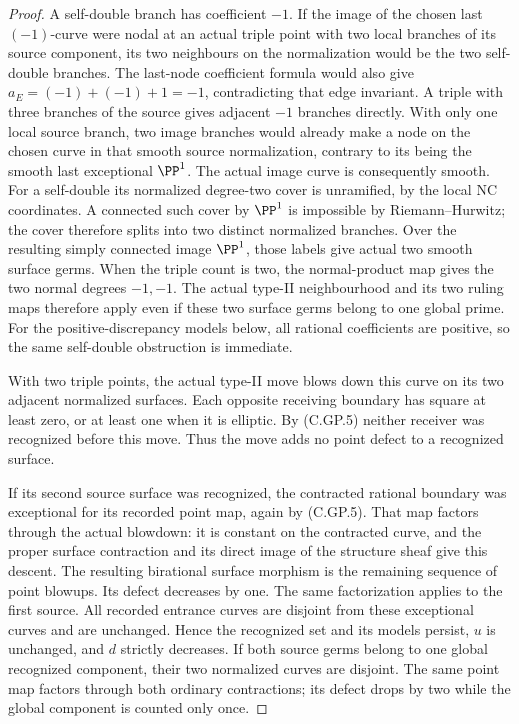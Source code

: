 \begin{proof}
A self-double branch has coefficient \(-1\).
If the image of the chosen last \((-1)\)-curve
were nodal at an actual triple point with two
local branches of its source component, its
two neighbours on the normalization would be
the two self-double branches. The last-node
coefficient formula would also give
\(a_E=(-1)+(-1)+1=-1\), contradicting that
edge invariant. A triple with three branches
of the source gives adjacent \(-1\) branches
directly. With only one local source branch,
two image branches would already make a node
on the chosen curve in that smooth source
normalization, contrary to its being the
smooth last exceptional \(\PP^1\).
The actual image curve is consequently
smooth. For a self-double its normalized
degree-two cover is unramified, by the local
NC coordinates. A connected such cover by
\(\PP^1\) is impossible by Riemann--Hurwitz;
the cover therefore splits into two distinct
normalized branches. Over the resulting
simply connected image \(\PP^1\), those
labels give actual two smooth surface germs.
When the triple count is two, the normal-product
map gives the two normal degrees \(-1,-1\).
The actual type-II neighbourhood and its two
ruling maps therefore apply even if these
two surface germs belong to one global prime.
For the positive-discrepancy models below,
all rational coefficients are positive, so
the same self-double obstruction is immediate.

With two triple points, the actual type-II move
blows down this curve on its two adjacent
normalized surfaces. Each opposite receiving
boundary has square at least zero, or at least
one when it is elliptic. By (C.GP.5) neither
receiver was recognized before this move. Thus
the move adds no point defect to a recognized
surface.

If its second source surface was recognized,
the contracted rational boundary was exceptional
for its recorded point map, again by (C.GP.5).
That map factors through the actual blowdown:
it is constant on the contracted curve, and
the proper surface contraction and its direct
image of the structure sheaf give this descent.
The resulting birational surface morphism is
the remaining sequence of point blowups. Its
defect decreases by one. The same factorization
applies to the first source. All recorded
entrance curves are disjoint from these
exceptional curves and are unchanged. Hence
the recognized set and its models persist,
\(u\) is unchanged, and \(d\) strictly decreases.
If both source germs belong to one global
recognized component, their two normalized
curves are disjoint. The same point map
factors through both ordinary contractions;
its defect drops by two while the global
component is counted only once.


\end{proof}
